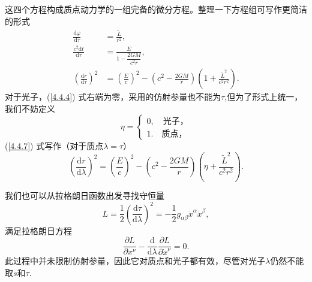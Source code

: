 \documentclass[11pt, a4paper, oneside, onecolumn]{ctexart}
\numberwithin{equation}{subsection}
\begin{document}
\newpage
这四个方程构成质点动力学的一组完备的微分方程。整理一下方程组可写作更简洁的形式
\begin{align}
\frac{\mathrm{d}\varphi}{\mathrm{d}\tau}&=\frac{\widetilde{L}}{r^{2}},\\
\frac{c^{2}\mathrm{d}t}{\mathrm{d}\tau}&=\frac{E}{1-\dfrac{2GM}{c^{2}r}},\\
\left(\frac{\mathrm{d}r}{\mathrm{d}\tau}\right)^{2}&=\left(\frac{E}{c}\right)^{2}-\left(c^{2}-\frac{2GM}{r}\right)\left(1+\frac{\widetilde{L}^{2}}{c^{2}r^{2}}\right).\label{4.4.7}
\end{align}
对于光子，(\ref{4.4.4}) 式右端为零，采用的仿射参量也不能为$\tau$,但为了形式上统一，我们不妨定义
\begin{equation}
\eta=
\begin{cases}
0,\quad\text{光子，}\\
1.\quad\text{质点，}
\end{cases}
\end{equation}
(\ref{4.4.7}) 式写作（对于质点$\lambda=\tau$）
\begin{equation}
\left(\frac{\mathrm{d}r}{\mathrm{d}\lambda}\right)^{2}=\left(\frac{E}{c}\right)^{2}-\left(c^{2}-\frac{2GM}{r}\right)\left(\eta+\frac{\widetilde{L}^{2}}{c^{2}r^{2}}\right).
\end{equation}

我们也可以从拉格朗日函数出发寻找守恒量
\begin{equation}
L=\frac12\left(\frac{\mathrm{d}\tau}{\mathrm{d}\lambda}\right)^{2}=-\frac12g_{\alpha\beta}\dot{x}^{\alpha}\dot{x}^{\beta},
\end{equation}
满足拉格朗日方程
\begin{equation}
\frac{\partial{}L}{\partial{}x^{\nu}}-\frac{\mathrm{d}}{\mathrm{d}\lambda}\frac{\partial{}L}{\partial{}\dot{x}^{\nu}}=0.
\end{equation}
此过程中并未限制仿射参量，因此它对质点和光子都有效，尽管对光子$\lambda$仍然不能取$s$和$\tau$.
\end{document}
